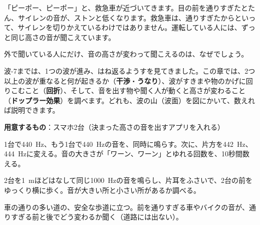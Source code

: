 \begin{hatena}
\noindent\begin{minipage}[c]{0.52\linewidth}\raggedright
「ピーポー、ピーポー」と、救急車が近づいてきます。目の前を通りすぎたとたん、サイレンの音が、ストンと低くなります。救急車は、通りすぎたからといって、サイレンを切りかえているわけではありません。運転している人には、ずっと同じ高さの音が聞こえています。

外で聞いている人にだけ、音の高さが変わって聞こえるのは、なぜでしょう。
\end{minipage}\hfill
\begin{minipage}[c]{0.45\linewidth}\centering
{}
\end{minipage}
\end{hatena}

\noindent 波-7までは、1つの波が進み、はね返るようすを見てきました。この章では、2つ以上の波が重なると何が起きるか（\textbf{干渉}・\textbf{うなり}）、波がすきまや物のかげに回りこむこと（\textbf{回折}）、そして、音を出す物や聞く人が動くと高さが変わること（\textbf{ドップラー効果}）を調べます。どれも、波の山（波面）を図にかいて、数えれば説明できます。

\begin{yattemiyou}
\textbf{用意するもの}：スマホ2台（決まった高さの音を出すアプリを入れる）\par\vspace{2pt}
\begin{enumerate}[label={\bkcircled[bkGreen]{\arabic*}}, leftmargin=2.4\zw, itemsep=1pt, topsep=0pt]
\item 1台で\qty{440}{Hz}、もう1台で\qty{440}{Hz}の音を、同時に鳴らす。次に、片方を\qty{442}{Hz}、\qty{444}{Hz}に変える。音の大きさが「ワーン、ワーン」とゆれる回数を、10秒間数える。
\item 2台を\qty{1}{m}ほどはなして同じ\qty{1000}{Hz}の音を鳴らし、片耳をふさいで、2台の前をゆっくり横に歩く。音が大きい所と小さい所があるか調べる。
\item 車の通りの多い道の、安全な歩道に立つ。前を通りすぎる車やバイクの音が、通りすぎる前と後でどう変わるか聞く（道路には出ない）。
\end{enumerate}
\end{yattemiyou}

